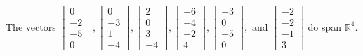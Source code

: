 \begin{exercise}
\begin{exerciseStatement}
  \end{exerciseStatement}
  \begin{exerciseAnswer}
   The vectors \(\left[\begin{array}{r}
0 \\
-2 \\
-5 \\
0
\end{array}\right] , \left[\begin{array}{r}
0 \\
-3 \\
1 \\
-4
\end{array}\right] , \left[\begin{array}{r}
2 \\
0 \\
3 \\
-4
\end{array}\right] , \left[\begin{array}{r}
-6 \\
-4 \\
-2 \\
4
\end{array}\right] , \left[\begin{array}{r}
-3 \\
0 \\
-5 \\
0
\end{array}\right] , \text{ and } \left[\begin{array}{r}
-2 \\
-2 \\
-1 \\
3
\end{array}\right]\) 
  	 do  
	span \(\mathbb{R}^4\).
  


  \end{exerciseAnswer}
\end{exercise}
